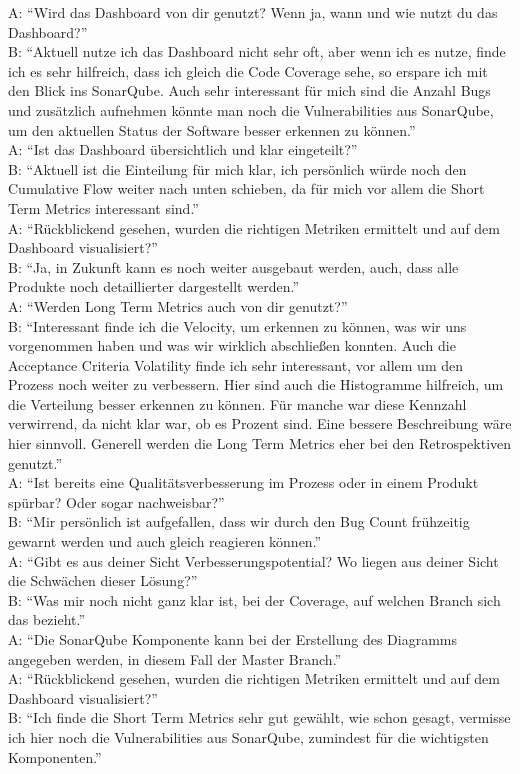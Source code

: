 A\@: ``Wird das Dashboard von dir genutzt? Wenn ja, wann und wie nutzt du das Dashboard?'' \\
B\@: ``Aktuell nutze ich das Dashboard nicht sehr oft, aber wenn ich es nutze, finde ich es sehr hilfreich, dass ich gleich die Code Coverage sehe, so erspare ich mit den Blick ins SonarQube. Auch sehr interessant für mich sind die Anzahl Bugs und zusätzlich aufnehmen könnte man noch die Vulnerabilities aus SonarQube, um den aktuellen Status der Software besser erkennen zu können.'' \\
A\@: ``Ist das Dashboard übersichtlich und klar eingeteilt?'' \\
B\@: ``Aktuell ist die Einteilung für mich klar, ich persönlich würde noch den Cumulative Flow weiter nach unten schieben, da für mich vor allem die Short Term Metrics interessant sind.'' \\
A\@: ``Rückblickend gesehen, wurden die richtigen Metriken ermittelt und auf dem Dashboard visualisiert?'' \\
B\@: ``Ja, in Zukunft kann es noch weiter ausgebaut werden, auch, dass alle Produkte noch detaillierter dargestellt werden.'' \\
A\@: ``Werden Long Term Metrics auch von dir genutzt?'' \\
B\@: ``Interessant finde ich die Velocity, um erkennen zu können, was wir uns vorgenommen haben und was wir wirklich abschließen konnten. Auch die Acceptance Criteria Volatility finde ich sehr interessant, vor allem um den Prozess noch weiter zu verbessern. Hier sind auch die Histogramme hilfreich, um die Verteilung besser erkennen zu können. Für manche war diese Kennzahl verwirrend, da nicht klar war, ob es Prozent sind. Eine bessere Beschreibung wäre hier sinnvoll. Generell werden die Long Term Metrics eher bei den Retrospektiven genutzt.'' \\
A\@: ``Ist bereits eine Qualitätsverbesserung im Prozess oder in einem Produkt spürbar? Oder sogar nachweisbar?'' \\
B\@: ``Mir persönlich ist aufgefallen, dass wir durch den Bug Count frühzeitig gewarnt werden und auch gleich reagieren können.'' \\
A\@: ``Gibt es aus deiner Sicht Verbesserungspotential? Wo liegen aus deiner Sicht die Schwächen dieser Lösung?'' \\
B\@: ``Was mir noch nicht ganz klar ist, bei der Coverage, auf welchen Branch sich das bezieht.'' \\
A\@: ``Die SonarQube Komponente kann bei der Erstellung des Diagramms angegeben werden, in diesem Fall der Master Branch.'' \\
A\@: ``Rückblickend gesehen, wurden die richtigen Metriken ermittelt und auf dem Dashboard visualisiert?'' \\
B\@: ``Ich finde die Short Term Metrics sehr gut gewählt, wie schon gesagt, vermisse ich hier noch die Vulnerabilities aus SonarQube, zumindest für die wichtigsten Komponenten.''
